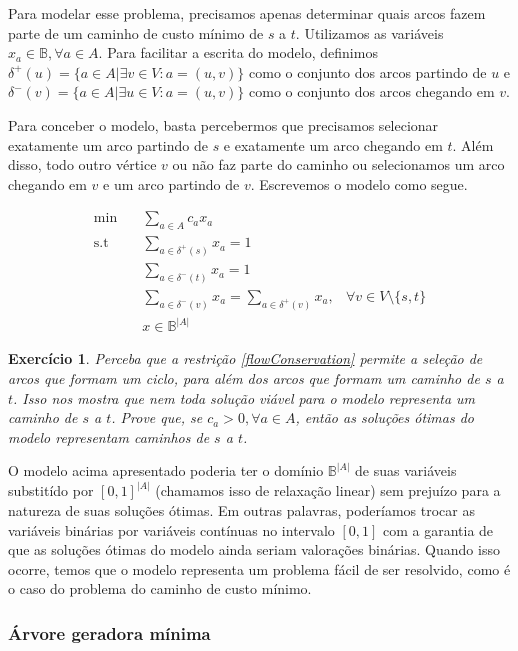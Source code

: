\documentclass[]{article}
\newtheorem{exercicio}{Exercício}
\numberwithin{equation}{section}
\begin{document}
Para modelar esse problema, precisamos apenas determinar quais arcos fazem parte de um caminho de
custo mínimo de $s$ a $t$.
Utilizamos as variáveis $x_a \in \mathbb{B}, \forall a \in A$.
Para facilitar a escrita do modelo, definimos
$\delta^+(u) = \{a \in A | \exists v \in V : a = (u, v)\}$ como o conjunto dos arcos partindo de $u$
e $\delta^-(v) = \{a \in A | \exists u \in V : a = (u, v)\}$ como o conjunto dos arcos chegando em
$v$.

Para conceber o modelo, basta percebermos que precisamos selecionar exatamente um arco partindo de
$s$ e exatamente um arco chegando em $t$. Além disso, todo outro vértice $v$ ou não faz parte do
caminho ou selecionamos um arco chegando em $v$ e um arco partindo de $v$. Escrevemos o modelo como
segue.

\begin{align}
\min        &\quad  \sum_{a \in A} c_ax_a \\
\text{s.t}  &\quad  \sum_{a \in \delta^+(s)} x_a = 1 \\
            &\quad  \sum_{a \in \delta^-(t)} x_a = 1 \\
            &\quad  \sum_{a \in \delta^-(v)} x_a = \sum_{a \in \delta^+(v)} x_a, & \forall v \in V
            \setminus \{s, t\} \label{flowConservation} \\
            &\quad  x \in \mathbb{B}^{|A|}
\end{align}

\begin{exercicio}
  Perceba que a restrição \eqref{flowConservation} permite a seleção
  de arcos que formam um ciclo, para além dos arcos que formam um
  caminho de $s$ a $t$.  Isso nos mostra que nem toda solução viável
  para o modelo representa um caminho de $s$ a $t$.  Prove que, se
  $c_a > 0, \forall a \in A$, então as soluções ótimas do modelo
  representam caminhos de $s$ a $t$.
\end{exercicio}

O modelo acima apresentado poderia ter o domínio $\mathbb{B}^{|A|}$ de suas variáveis substitído por
$[0, 1]^{|A|}$ (chamamos isso de relaxação linear) sem prejuízo para a natureza de suas soluções
ótimas.
Em outras palavras, poderíamos trocar as variáveis binárias por variáveis contínuas no intervalo
$[0, 1]$ com a garantia de que as soluções ótimas do modelo ainda seriam valorações binárias.
Quando isso ocorre, temos que o modelo representa um problema fácil de ser resolvido, como é o caso
do problema do caminho de custo mínimo.

\subsubsection{Árvore geradora mínima}
\end{document}
